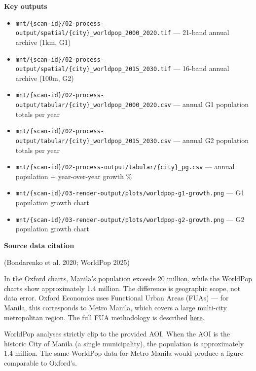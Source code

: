 \documentclass[
  letterpaper,
  DIV=11,
  numbers=noendperiod]{scrreprt}
\providecommand{\tightlist}{%
  \setlength{\itemsep}{0pt}\setlength{\parskip}{0pt}}
\begin{document}
\textbf{Key outputs}

\begin{itemize}
\tightlist
\item
  \texttt{mnt/\{scan-id\}/02-process-output/spatial/\{city\}\_worldpop\_2000\_2020.tif}
  --- 21-band annual archive (1km, G1)
\item
  \texttt{mnt/\{scan-id\}/02-process-output/spatial/\{city\}\_worldpop\_2015\_2030.tif}
  --- 16-band annual archive (100m, G2)
\item
  \texttt{mnt/\{scan-id\}/02-process-output/tabular/\{city\}\_worldpop\_2000\_2020.csv}
  --- annual G1 population totals per year
\item
  \texttt{mnt/\{scan-id\}/02-process-output/tabular/\{city\}\_worldpop\_2015\_2030.csv}
  --- annual G2 population totals per year
\item
  \texttt{mnt/\{scan-id\}/02-process-output/tabular/\{city\}\_pg.csv}
  --- annual population + year-over-year growth \%
\item
  \texttt{mnt/\{scan-id\}/03-render-output/plots/worldpop-g1-growth.png}
  --- G1 population growth chart
\item
  \texttt{mnt/\{scan-id\}/03-render-output/plots/worldpop-g2-growth.png}
  --- G2 population growth chart
\end{itemize}

\textbf{Source data citation}

(Bondarenko et al. 2020; WorldPop 2025)

\begin{tcolorbox}[enhanced jigsaw, arc=.35mm, bottomrule=.15mm, bottomtitle=1mm, breakable, colback=white, colbacktitle=quarto-callout-tip-color!10!white, colframe=quarto-callout-tip-color-frame, coltitle=black, left=2mm, leftrule=.75mm, opacityback=0, opacitybacktitle=0.6, rightrule=.15mm, title=\textcolor{quarto-callout-tip-color}{\faLightbulb}\hspace{0.5em}{Why does Oxford show a much larger population than WorldPop?}, titlerule=0mm, toprule=.15mm, toptitle=1mm]

In the Oxford charts, Manila's population exceeds 20 million, while the
WorldPop charts show approximately 1.4 million. The difference is
geographic scope, not data error. Oxford Economics uses Functional Urban
Areas (FUAs) --- for Manila, this corresponds to Metro Manila, which
covers a large multi-city metropolitan region. The full FUA methodology
is described
\href{https://www.oecd.org/en/publications/cities-in-the-world_d0efcbda-en.html}{here}.

WorldPop analyses strictly clip to the provided AOI. When the AOI is the
historic City of Manila (a single municipality), the population is
approximately 1.4 million. The same WorldPop data for Metro Manila would
produce a figure comparable to Oxford's.

\end{tcolorbox}
\end{document}
